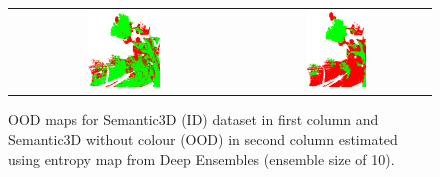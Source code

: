 \begin{figure}[h!]
\begin{tabular}{cc}
            \includegraphics[width=0.33\textwidth, height=0.18\textheight]{images/ood_imgs/sem3d_of/ent/de_sem3d_OOD_3.pdf}&
            \includegraphics[width=0.33\textwidth, height=0.18\textheight]{images/ood_imgs/sem3d_of/ent/de_sem3d_of_OOD_3.pdf}\\
        \end{tabular}
        \caption{OOD maps for Semantic3D (ID) dataset in first column and Semantic3D without colour (OOD) in second column estimated using entropy map from Deep Ensembles (ensemble size of 10).}
        \label{fig:de_oodmap_sem3d_OF_ent}
    \end{figure}

